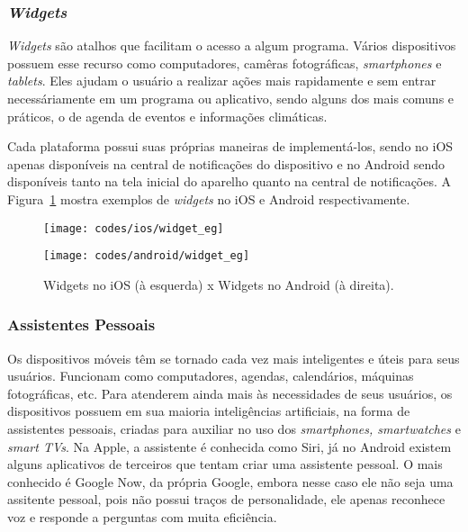 \subsubsection{\textit{Widgets}} \label{subsubsec:widgets}
\textit{Widgets} são atalhos que facilitam o acesso a algum programa. Vários dispositivos possuem esse recurso como computadores, camêras fotográficas, \textit{smartphones} e \textit{tablets}. Eles ajudam o usuário a 
realizar ações mais rapidamente e sem entrar necessáriamente em um programa ou aplicativo, sendo alguns dos mais comuns e práticos, o de agenda de eventos e informações climáticas.

Cada plataforma possui suas próprias maneiras de implementá-los, sendo no iOS apenas disponíveis na central de notificações do dispositivo e no Android sendo disponíveis tanto na tela inicial do aparelho quanto na central 
de notificações. A Figura~\ref{fig:widgets_sample} mostra exemplos de \textit{widgets} no iOS e Android respectivamente.

\begin{figure}[H]
		\centering
		\begin{minipage}{.5\textwidth}
			\centering
			\texttt{[image: codes/ios/widget\_eg]}
		\end{minipage}%
		\begin{minipage}{.5\textwidth}
			\centering
			\texttt{[image: codes/android/widget\_eg]}
		\end{minipage}
	\caption[Widgets no iOS (à esquerda) x Widgets no Android (à direita).]{Widgets no iOS (à esquerda) x Widgets no Android (à direita).}
	\label{fig:widgets_sample}
	\end{figure}

\subsubsection{Assistentes Pessoais} \label{subsubsec:siri}
Os dispositivos móveis têm se tornado cada vez mais inteligentes e úteis para seus usuários. Funcionam como computadores, agendas, calendários, máquinas fotográficas, etc. Para atenderem ainda mais às necessidades de 
seus usuários, os dispositivos possuem em sua maioria inteligências artificiais, na forma de assistentes pessoais, criadas para auxiliar no uso dos \textit{smartphones, smartwatches} e \textit{smart TVs}. 
Na Apple, a assistente é conhecida como Siri, já no Android existem alguns aplicativos de terceiros que tentam criar uma assistente pessoal. O mais conhecido é Google Now, da própria Google, 
embora nesse caso ele não seja uma assitente pessoal, pois não possui traços de personalidade, ele apenas reconhece voz e responde a perguntas com muita eficiência.

